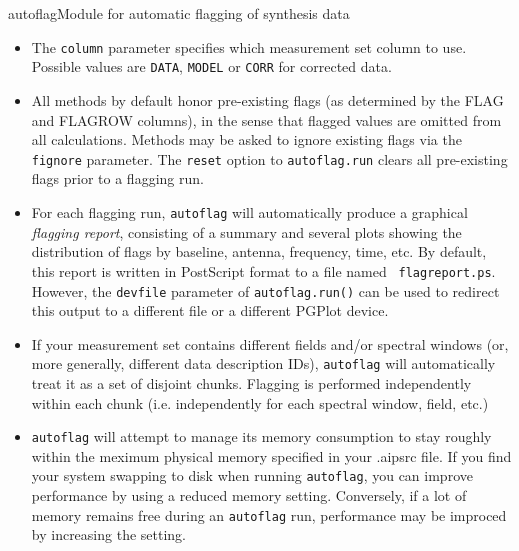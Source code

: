 \begin{ahmodule}{autoflag}{Module for automatic flagging of synthesis data}
\begin{ahdescription}
\begin{itemize}
\item The {\tt column} parameter specifies which measurement set column to use.
Possible values are {\tt DATA}, {\tt MODEL} or {\tt CORR} for corrected data.

\item All methods by default honor pre-existing flags (as determined by the
FLAG and FLAGROW columns), in the sense that flagged values are omitted from
all calculations. Methods may be asked to ignore existing flags via the {\tt
fignore} parameter. The {\tt reset} option to  {\tt autoflag.run} clears
all pre-existing flags prior to a flagging run.

\item For each flagging run, {\tt autoflag} will automatically produce a
graphical  {\em flagging report}, consisting of a summary and several plots
showing the distribution of flags by baseline, antenna, frequency, time, etc.
By default, this report is written in PostScript format to a file named {\tt
flagreport.ps}. However, the {\tt devfile} parameter of {\tt autoflag.run()}
can be used to redirect this output to a different file or a different PGPlot
device.

\item If your measurement set contains different fields and/or spectral windows
(or, more generally, different data description IDs), {\tt autoflag} will
automatically treat it as a set of disjoint chunks. Flagging is performed
independently within each chunk (i.e. independently for each spectral window,
field, etc.)

\item {\tt autoflag} will attempt to manage its memory consumption to stay
roughly within the meximum physical memory specified in your .aipsrc file. 
If you find your system swapping to disk when running {\tt autoflag}, you can
improve performance by using a reduced memory setting. Conversely, if a lot of
memory remains free during an {\tt autoflag} run, performance may be improced by
increasing the setting.

\end{itemize}

\end{ahdescription}



\end{ahmodule}

